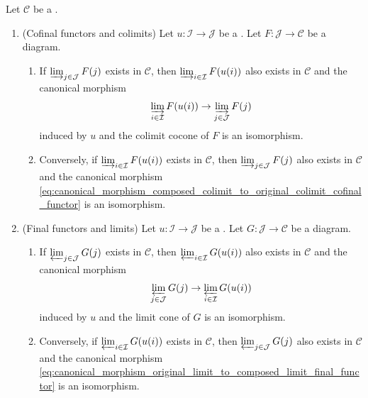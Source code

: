 \begin{theorem} \label{theorem:cofinal_functors_reduce_colimits_final_functors_reduce_limits}
Let $\mathcal{C}$ be a .
\begin{enumerate}
    \item \label{item:cofinal_functor_colimit_exists_implies_composed_colimit_exists} (Cofinal functors and colimits) Let $u : \mathcal{I} \to \mathcal{J}$ be a . Let $F : \mathcal{J} \to \mathcal{C}$ be a diagram.
    \begin{enumerate}
        \item If $\varinjlim_{j \in \mathcal{J}} F(j)$ exists in $\mathcal{C}$, then $\varinjlim_{i \in \mathcal{I}} F(u(i))$ also exists in $\mathcal{C}$ and the canonical morphism
        \begin{equation} \label{eq:canonical_morphism_composed_colimit_to_original_colimit_cofinal_functor}
        \varinjlim_{i \in \mathcal{I}} F(u(i)) \to \varinjlim_{j \in \mathcal{J}} F(j)
        \end{equation}
        induced by $u$ and the colimit cocone of $F$ is an isomorphism.

        \item Conversely, if $\varinjlim_{i \in \mathcal{I}} F(u(i))$ exists in $\mathcal{C}$, then $\varinjlim_{j \in \mathcal{J}} F(j)$ also exists in $\mathcal{C}$ and the canonical morphism \eqref{eq:canonical_morphism_composed_colimit_to_original_colimit_cofinal_functor} is an isomorphism.
    \end{enumerate}

    \item \label{item:final_functor_limit_exists_implies_composed_limit_exists} (Final functors and limits) Let $u : \mathcal{I} \to \mathcal{J}$ be a . Let $G : \mathcal{J} \to \mathcal{C}$ be a diagram.
    \begin{enumerate}
        \item If $\varprojlim_{j \in \mathcal{J}} G(j)$ exists in $\mathcal{C}$, then $\varprojlim_{i \in \mathcal{I}} G(u(i))$ also exists in $\mathcal{C}$ and the canonical morphism
        \begin{equation} \label{eq:canonical_morphism_original_limit_to_composed_limit_final_functor}
        \varprojlim_{j \in \mathcal{J}} G(j) \to \varprojlim_{i \in \mathcal{I}} G(u(i))
        \end{equation}
        induced by $u$ and the limit cone of $G$ is an isomorphism.

        \item Conversely, if $\varprojlim_{i \in \mathcal{I}} G(u(i))$ exists in $\mathcal{C}$, then $\varprojlim_{j \in \mathcal{J}} G(j)$ also exists in $\mathcal{C}$ and the canonical morphism \eqref{eq:canonical_morphism_original_limit_to_composed_limit_final_functor} is an isomorphism.
    \end{enumerate}
\end{enumerate}
\end{theorem}
